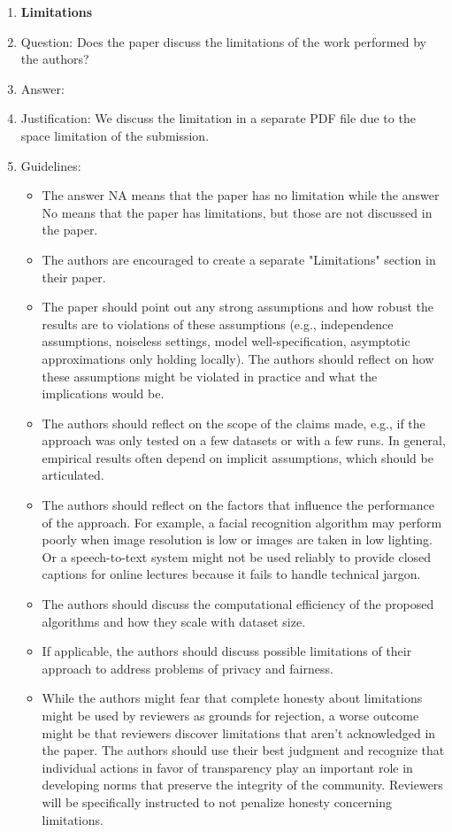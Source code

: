 \documentclass{article}
\begin{document}
\begin{enumerate}
\item {\bf Limitations}
    \item[] Question: Does the paper discuss the limitations of the work performed by the authors?
    \item[] Answer: \answerYes{} %
    \item[] Justification: We discuss the limitation in a separate PDF file due to the space limitation of the submission.
    \item[] Guidelines:
    \begin{itemize}
        \item The answer NA means that the paper has no limitation while the answer No means that the paper has limitations, but those are not discussed in the paper. 
        \item The authors are encouraged to create a separate "Limitations" section in their paper.
        \item The paper should point out any strong assumptions and how robust the results are to violations of these assumptions (e.g., independence assumptions, noiseless settings, model well-specification, asymptotic approximations only holding locally). The authors should reflect on how these assumptions might be violated in practice and what the implications would be.
        \item The authors should reflect on the scope of the claims made, e.g., if the approach was only tested on a few datasets or with a few runs. In general, empirical results often depend on implicit assumptions, which should be articulated.
        \item The authors should reflect on the factors that influence the performance of the approach. For example, a facial recognition algorithm may perform poorly when image resolution is low or images are taken in low lighting. Or a speech-to-text system might not be used reliably to provide closed captions for online lectures because it fails to handle technical jargon.
        \item The authors should discuss the computational efficiency of the proposed algorithms and how they scale with dataset size.
        \item If applicable, the authors should discuss possible limitations of their approach to address problems of privacy and fairness.
        \item While the authors might fear that complete honesty about limitations might be used by reviewers as grounds for rejection, a worse outcome might be that reviewers discover limitations that aren't acknowledged in the paper. The authors should use their best judgment and recognize that individual actions in favor of transparency play an important role in developing norms that preserve the integrity of the community. Reviewers will be specifically instructed to not penalize honesty concerning limitations.
    \end{itemize}


\end{enumerate}
\end{document}
